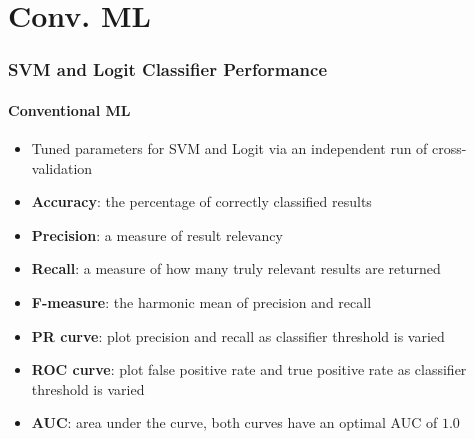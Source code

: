 \documentclass{beamer}
\begin{document}
\section{Conv. ML}
\begin{frame}
    \frametitle{SVM and Logit Classifier Performance}  %
    \framesubtitle{Conventional ML}
    \begin{itemize}
        \item Tuned parameters for SVM and Logit via an independent run of cross-validation
        \item \textbf{Accuracy}: the percentage of correctly classified results
        \item \textbf{Precision}: a measure of result relevancy
        \item \textbf{Recall}: a measure of how many truly relevant results are returned
        \item \textbf{F-measure}: the harmonic mean of precision and recall
        \item \textbf{PR curve}: plot precision and recall as classifier threshold is varied
        \item \textbf{ROC curve}: plot false positive rate and true positive rate as classifier threshold is varied
        \item \textbf{AUC}: area under the curve, both curves have an optimal AUC of $1.0$
    \end{itemize}
\end{frame}
\end{document}
